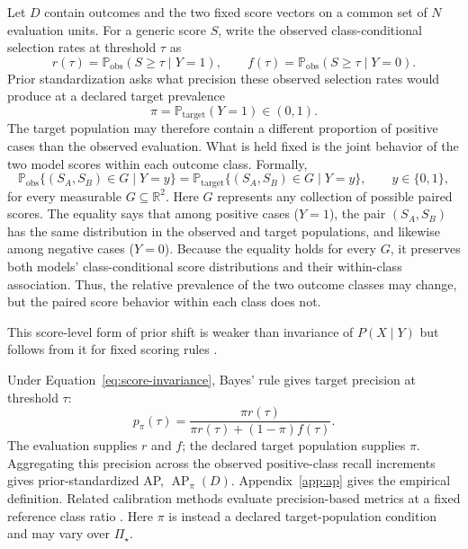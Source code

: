 \documentclass[11pt]{article}
\newcommand{\AP}{\operatorname{AP}}
\newcommand{\PSet}{\Pi_\star}
\newcommand{\Prb}{\mathbb{P}}
\theoremstyle{remark}
\begin{document}
Let $D$ contain outcomes and the two fixed score vectors on a common set of
$N$ evaluation units. For a generic score $S$, write the observed
class-conditional selection rates at threshold $\tau$ as
\[
r(\tau)=\Prb_{\mathrm{obs}}(S\geq\tau\mid Y=1),
\qquad
f(\tau)=\Prb_{\mathrm{obs}}(S\geq\tau\mid Y=0).
\]
Prior standardization asks what precision these observed selection rates would
produce at a declared target prevalence
\[
\pi=\Prb_{\mathrm{target}}(Y=1)\in(0,1).
\]
The target population may therefore contain a different proportion of positive
cases than the observed evaluation. What is held fixed is the joint behavior
of the two model scores within each outcome class. Formally,
\begin{equation}
\Prb_{\mathrm{obs}}\{(S_A,S_B)\in G\mid Y=y\}
=
\Prb_{\mathrm{target}}\{(S_A,S_B)\in G\mid Y=y\},
\qquad y\in\{0,1\},
\label{eq:score-invariance}
\end{equation}
for every measurable $G\subseteq\mathbb R^2$. Here $G$ represents any
collection of possible paired scores. The equality says that among positive
cases ($Y=1$), the pair $(S_A,S_B)$ has the same distribution in the observed
and target populations, and likewise among negative cases ($Y=0$). Because the
equality holds for every $G$, it preserves both models' class-conditional score
distributions and their within-class association. Thus, the relative
prevalence of the two outcome classes may change, but the paired score behavior
within each class does not.

This score-level form of prior shift is weaker than invariance of $P(X\mid Y)$
but follows from it for fixed scoring rules
\cite{saerens2002adjusting,storkey2009training,lipton2018detecting}.

Under Equation~\eqref{eq:score-invariance}, Bayes' rule gives target precision
at threshold $\tau$:
\begin{equation}
p_\pi(\tau)
=
\frac{\pi r(\tau)}
{\pi r(\tau)+(1-\pi)f(\tau)}.
\label{eq:reference-precision}
\end{equation}
The evaluation supplies $r$ and $f$; the declared target population supplies
$\pi$. Aggregating this precision across the observed positive-class recall
increments gives prior-standardized AP, $\AP_\pi(D)$. Appendix~\ref{app:ap}
gives the empirical definition. Related calibration methods evaluate
precision-based metrics at a fixed reference class ratio
\cite{siblini2020calibration}. Here $\pi$ is instead a declared target-population
condition and may vary over $\PSet$.
\end{document}
